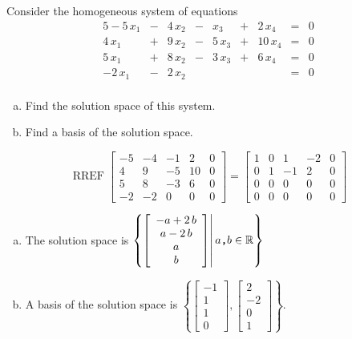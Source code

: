 
\begin{exerciseStatement}


Consider the homogeneous system of equations 
\begin{alignat*}{5} -5 \, x_{1} &-& 4 \, x_{2} &-& x_{3} &+& 2 \, x_{4} &=& 0 \\4 \, x_{1} &+& 9 \, x_{2} &-& 5 \, x_{3} &+& 10 \, x_{4} &=& 0 \\5 \, x_{1} &+& 8 \, x_{2} &-& 3 \, x_{3} &+& 6 \, x_{4} &=& 0 \\-2 \, x_{1} &-& 2 \, x_{2} & &  & &  &=& 0 \\ \end{alignat*}
            


\begin{enumerate}[(a)]
\item  Find the solution space of this system.
\item  Find a basis of the solution space.
\end{enumerate}
    
\end{exerciseStatement}
    
\begin{exerciseAnswer} 


\[\operatorname{RREF} \left[\begin{array}{cccc|c}
-5 & -4 & -1 & 2 & 0 \\
4 & 9 & -5 & 10 & 0 \\
5 & 8 & -3 & 6 & 0 \\
-2 & -2 & 0 & 0 & 0
\end{array}\right] = \left[\begin{array}{cccc|c}
1 & 0 & 1 & -2 & 0 \\
0 & 1 & -1 & 2 & 0 \\
0 & 0 & 0 & 0 & 0 \\
0 & 0 & 0 & 0 & 0
\end{array}\right] \]


\begin{enumerate}[(a)]
\item The solution space is \( \left\{ \left[\begin{array}{c}
-a + 2 \, b \\
a - 2 \, b \\
a \\
b
\end{array}\right] \middle|\,a\text{\texttt{,}}b\in\mathbb{R}\right\} \)
\item A basis of the solution space is \( \left\{ \left[\begin{array}{c}
-1 \\
1 \\
1 \\
0
\end{array}\right] , \left[\begin{array}{c}
2 \\
-2 \\
0 \\
1
\end{array}\right] \right\} \).
\end{enumerate}
    
\end{exerciseAnswer}
    
